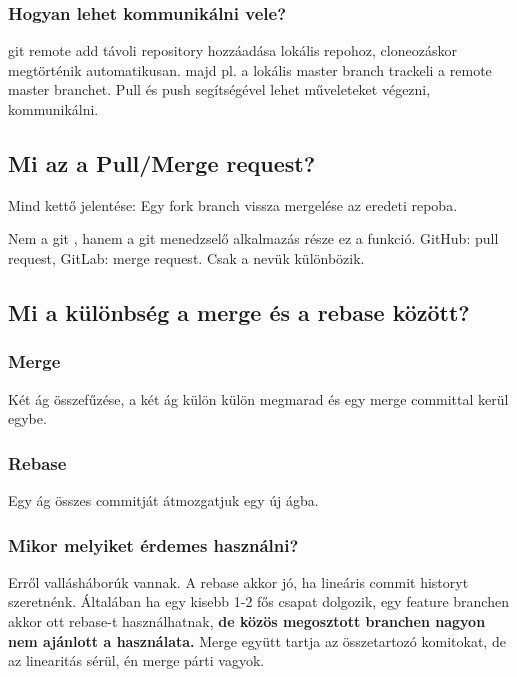 \documentclass[a4paper,14pt]{extarticle}
\begin{document}
			\subsubsection{Hogyan lehet kommunikálni vele?}
			git remote add távoli repository hozzáadása lokális repohoz, cloneozáskor megtörténik automatikusan. majd pl. a lokális master branch trackeli a remote master branchet. 
			Pull és push segítségével lehet műveleteket végezni, kommunikálni.
		\subsection{Mi az a Pull/Merge request?}
		Mind kettő jelentése: Egy fork branch vissza mergelése az eredeti repoba.
		
		Nem a git , hanem a git menedzselő alkalmazás része ez a funkció. GitHub: pull request, GitLab: merge request. Csak a nevük különbözik.
		\subsection{Mi a különbség a merge és a rebase között?}
			\subsubsection{Merge} Két ág összefűzése, a két ág külön külön megmarad és egy merge committal kerül egybe.
			\subsubsection{Rebase}
			Egy ág összes commitját átmozgatjuk egy új ágba.
			\subsubsection{Mikor melyiket érdemes használni?}
			Erről vallásháborúk vannak.
			A rebase akkor jó, ha lineáris commit historyt szeretnénk. Általában ha egy kisebb 1-2 fős csapat dolgozik, egy feature branchen akkor ott rebase-t használhatnak, \textbf{de közös megosztott branchen nagyon nem ajánlott a használata.} Merge együtt tartja az összetartozó komitokat, de az linearitás sérül, én merge párti vagyok.
\end{document}
